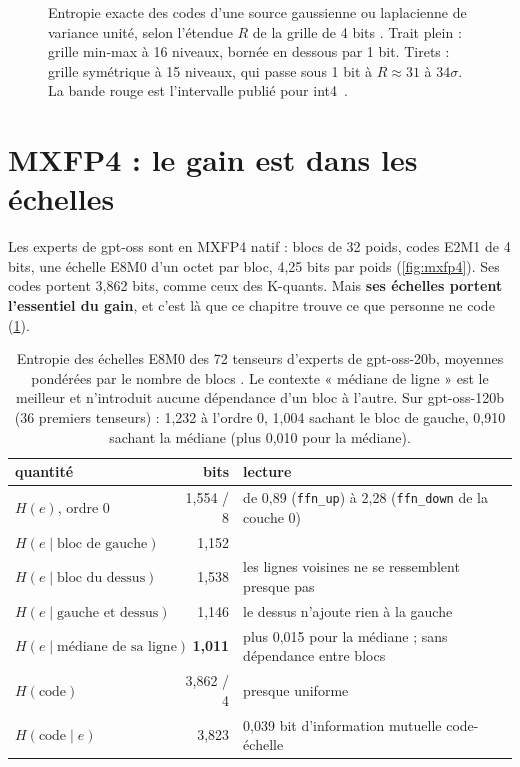 \begin{figure}[ht]
\centering
\GrapheEntropiePlage
\caption[Entropie des codes selon la plage de quantification]{Entropie exacte des codes d'une source gaussienne ou laplacienne de variance unité, selon l'étendue $R$ de la grille de 4 bits \calc. Trait plein : grille min-max à 16 niveaux, bornée en dessous par 1 bit. Tirets : grille symétrique à 15 niveaux, qui passe sous 1 bit à $R \approx 31$ à $34\sigma$. La bande rouge est l'intervalle publié pour int4~\cite{shannonbound2026}.}
\label{fig:ent-plage}
\end{figure}

\section{MXFP4 : le gain est dans les échelles}\label{sec:ent-mxfp4}

Les experts de gpt-oss sont en MXFP4 natif : blocs de 32 poids, codes E2M1 de 4 bits, une échelle E8M0 d'un octet par bloc, 4,25 bits par poids (\cref{fig:mxfp4}). Ses codes portent 3,862 bits, comme ceux des K-quants. Mais \textbf{ses échelles portent l'essentiel du gain}, et c'est là que ce chapitre trouve ce que personne ne code (\cref{tab:ent-echelles}).

\begin{table}[ht]
\centering\small
\caption[Entropie des échelles E8M0 selon le contexte]{Entropie des échelles E8M0 des 72 tenseurs d'experts de gpt-oss-20b, moyennes pondérées par le nombre de blocs \mes. Le contexte « médiane de ligne » est le meilleur et n'introduit aucune dépendance d'un bloc à l'autre. Sur gpt-oss-120b (36 premiers tenseurs) : 1,232 à l'ordre 0, 1,004 sachant le bloc de gauche, 0,910 sachant la médiane (plus 0,010 pour la médiane).}
\label{tab:ent-echelles}
\begin{tabular}{@{}lrl@{}}
\toprule
quantité & bits & lecture \\
\midrule
$H(e)$, ordre 0 & 1,554 / 8 & de 0,89 (\texttt{ffn\_up}) à 2,28 (\texttt{ffn\_down} de la couche 0) \\
$H(e \mid \text{bloc de gauche})$ & 1,152 & \\
$H(e \mid \text{bloc du dessus})$ & 1,538 & les lignes voisines ne se ressemblent presque pas \\
$H(e \mid \text{gauche et dessus})$ & 1,146 & le dessus n'ajoute rien à la gauche \\
$H(e \mid \text{médiane de sa ligne})$ & \textbf{1,011} & plus 0,015 pour la médiane ; sans dépendance entre blocs \\
$H(\text{code})$ & 3,862 / 4 & presque uniforme \\
$H(\text{code} \mid e)$ & 3,823 & 0,039 bit d'information mutuelle code-échelle \\
\bottomrule
\end{tabular}
\end{table}

